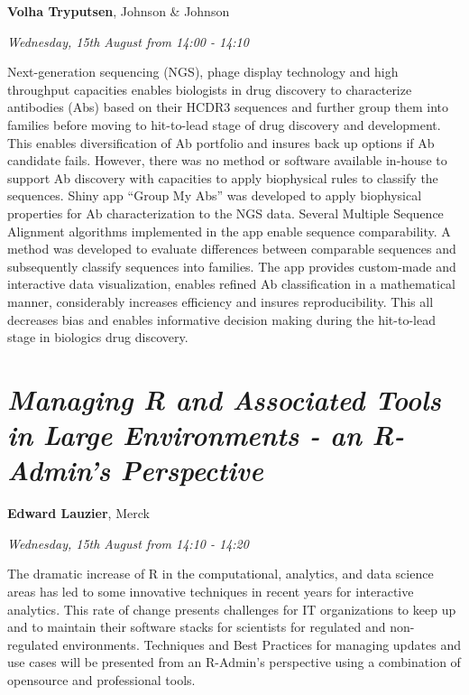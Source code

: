 \documentclass[]{book}
\theoremstyle{definition}
\theoremstyle{definition}
\theoremstyle{definition}
\theoremstyle{remark}
\begin{document}
\textbf{Volha Tryputsen}, Johnson \& Johnson

\emph{Wednesday, 15th August from 14:00 - 14:10}

Next-generation sequencing (NGS), phage display technology and high
throughput capacities enables biologists in drug discovery to
characterize antibodies (Abs) based on their HCDR3 sequences and further
group them into families before moving to hit-to-lead stage of drug
discovery and development. This enables diversification of Ab portfolio
and insures back up options if Ab candidate fails. However, there was no
method or software available in-house to support Ab discovery with
capacities to apply biophysical rules to classify the sequences. Shiny
app ``Group My Abs'' was developed to apply biophysical properties for
Ab characterization to the NGS data. Several Multiple Sequence Alignment
algorithms implemented in the app enable sequence comparability. A
method was developed to evaluate differences between comparable
sequences and subsequently classify sequences into families. The app
provides custom-made and interactive data visualization, enables refined
Ab classification in a mathematical manner, considerably increases
efficiency and insures reproducibility. This all decreases bias and
enables informative decision making during the hit-to-lead stage in
biologics drug discovery.

\hypertarget{managing-r-and-associated-tools-in-large-environments---an-r-admins-perspective-1}{%
\section{\texorpdfstring{\emph{Managing R and Associated Tools in Large
Environments - an R-Admin's
Perspective}}{Managing R and Associated Tools in Large Environments - an R-Admin's Perspective}}\label{managing-r-and-associated-tools-in-large-environments---an-r-admins-perspective-1}}

\textbf{Edward Lauzier}, Merck

\emph{Wednesday, 15th August from 14:10 - 14:20}

The dramatic increase of R in the computational, analytics, and data
science areas has led to some innovative techniques in recent years for
interactive analytics. This rate of change presents challenges for IT
organizations to keep up and to maintain their software stacks for
scientists for regulated and non-regulated environments. Techniques and
Best Practices for managing updates and use cases will be presented from
an R-Admin's perspective using a combination of opensource and
professional tools.
\end{document}
